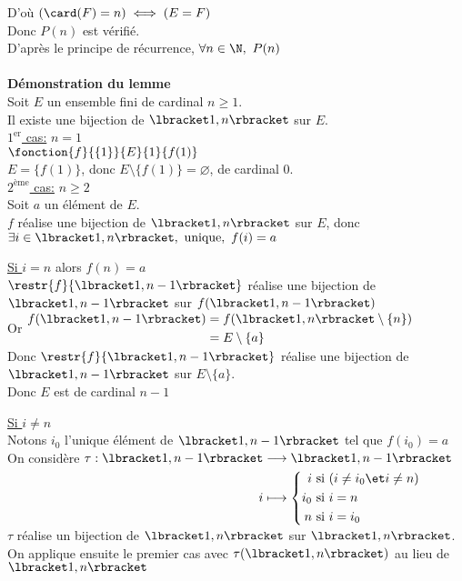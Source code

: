 \documentclass[12pt,twoside,a4paper]{article}
\begin{document}
\begin{preuve}
		D'où $(\card(F)=n)\iff(E=F)$\\
		Donc $P(n)$ est vérifié.\\
		D'après le principe de récurrence, $\forall n\in\N,\ P(n)$\\
		\\
		\textbf{Démonstration du lemme}\\
		Soit $E$ un ensemble fini de cardinal $n\geqslant 1$.\\
		Il existe une bijection de $\lbracket 1,n\rbracket$ sur $E$.\\
		\underline{$1^{\text{er}}$ cas:} $n=1$\\
		$\fonction{f}{\{1\}}{E}{1}{f(1)}$\\
		$E=\{f(1)\}$, donc $E\setminus \{f(1)\}=\varnothing$, de cardinal $0$.\\
		\underline{$2^{\text{ème}}$ cas:} $n\geqslant 2$\\
		Soit $a$ un élément de $E$.\\
		$f$ réalise une bijection de $\lbracket 1,n\rbracket$ sur $E$, donc $\exists i\in \lbracket 1,n\rbracket,\ \text{unique},\ f(i)=a$
		\begin{liste}
			\item \underline{Si $i=n$} alors $f(n)=a$\\
				$\restr{f}{\lbracket 1,n-1\rbracket}$ réalise une bijection de $\lbracket 1,n-1\rbracket$ sur $f(\lbracket 1,n-1\rbracket)$\\
				Or $\begin{aligned}
				f(\lbracket 1,n-1\rbracket)&=f(\lbracket 1,n\rbracket\setminus\{n\})\\
					&=E\setminus \{a\}
				\end{aligned}$\\
				Donc $\restr{f}{\lbracket 1,n-1\rbracket}$ réalise une bijection de $\lbracket 1,n-1\rbracket$ sur $E\setminus \{a\}$.\\
				Donc $E$ est de cardinal $n-1$
			\item \underline{Si $i\neq n$}\\
				Notons $i_0$ l'unique élément de $\lbracket 1,n-1\rbracket$ tel que $f(i_0)=a$\\
				On considère 
				$\begin{aligned}[t]
				\tau:\lbracket 1,n-1\rbracket &\longrightarrow \lbracket 1,n-1\rbracket\\
					i &\longmapsto 
					\left\{\begin{aligned}
					 i &\text{ si }(i\neq i_0\et i\neq n)\\
					 i_0 &\text{ si } i=n\\
					 n &\text{ si } i=i_0
					\end{aligned}\right.
				\end{aligned}$\\
				$\tau$ réalise un bijection de $\lbracket 1,n\rbracket$ sur $\lbracket 1,n\rbracket$.\\
				On applique ensuite le premier cas avec $\tau(\lbracket 1,n\rbracket)$ au lieu de $\lbracket 1,n\rbracket$
		\end{liste}
	\end{preuve}
\end{document}
